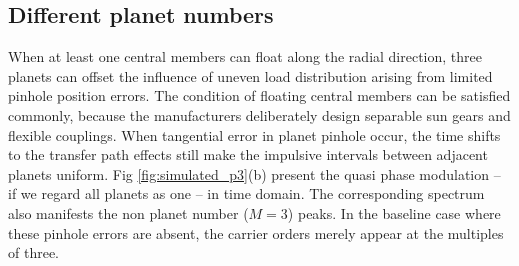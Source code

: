 \documentclass[a4paper,fleqn]{cas-sc}%
\begin{document}
\subsection{Different planet numbers}
\par When at least one central members can float along the radial direction, three planets can offset the influence of uneven load distribution arising from limited pinhole position errors. The condition of floating central members can be satisfied commonly, because the manufacturers deliberately design separable sun gears  and flexible couplings.  When tangential error in planet pinhole occur, the time shifts to the transfer path effects still make the impulsive intervals between adjacent planets uniform. Fig \ref{fig:simulated_p3}(b) present the quasi phase modulation -- if we regard all planets as one -- in time domain.  The corresponding spectrum also manifests the non planet number ($M=3$) peaks. In the baseline case where these pinhole errors are absent, the carrier orders merely appear at the multiples of three.
\end{document}
